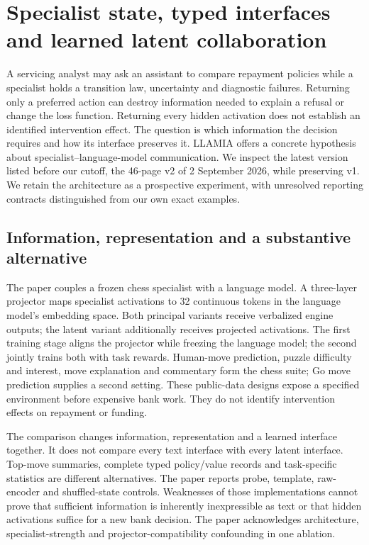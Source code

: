 \section{Specialist state, typed interfaces and learned latent collaboration}
\label{sec:exec24-collaboration}
A servicing analyst may ask an assistant to compare repayment policies while a specialist holds a transition law, uncertainty and diagnostic failures. Returning only a preferred action can destroy information needed to explain a refusal or change the loss function. Returning every hidden activation does not establish an identified intervention effect. The question is which information the decision requires and how its interface preserves it. LLAMIA offers a concrete hypothesis about specialist--language-model communication. We inspect the latest version listed before our cutoff, the 46-page v2 of 2 September 2026, while preserving v1. We retain the architecture as a prospective experiment, with unresolved reporting contracts distinguished from our own exact examples.~\citep{exec24_collaboration_original,exec24_collaboration_reference}

\subsection{Information, representation and a substantive alternative}
The paper couples a frozen chess specialist with a language model. A three-layer projector maps specialist activations to 32 continuous tokens in the language model's embedding space. Both principal variants receive verbalized engine outputs; the latent variant additionally receives projected activations. The first training stage aligns the projector while freezing the language model; the second jointly trains both with task rewards. Human-move prediction, puzzle difficulty and interest, move explanation and commentary form the chess suite; Go move prediction supplies a second setting. These public-data designs expose a specified environment before expensive bank work. They do not identify intervention effects on repayment or funding.~\citep{exec24_collaboration_original}

The comparison changes information, representation and a learned interface together. It does not compare every text interface with every latent interface. Top-move summaries, complete typed policy/value records and task-specific statistics are different alternatives. The paper reports probe, template, raw-encoder and shuffled-state controls. Weaknesses of those implementations cannot prove that sufficient information is inherently inexpressible as text or that hidden activations suffice for a new bank decision. The paper acknowledges architecture, specialist-strength and projector-compatibility confounding in one ablation.~\citep{exec24_collaboration_original}

